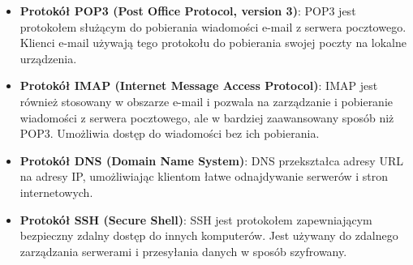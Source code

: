 \begin{itemize}
    \item \textbf{Protokół POP3 (Post Office Protocol, version 3)}: POP3 jest protokołem służącym do pobierania wiadomości e-mail z serwera pocztowego. Klienci e-mail używają tego protokołu do pobierania swojej poczty na lokalne urządzenia.

    \item \textbf{Protokół IMAP (Internet Message Access Protocol)}: IMAP jest również stosowany w obszarze e-mail i pozwala na zarządzanie i pobieranie wiadomości z serwera pocztowego, ale w bardziej zaawansowany sposób niż POP3. Umożliwia dostęp do wiadomości bez ich pobierania.

    \item \textbf{Protokół DNS (Domain Name System)}: DNS przekształca adresy URL na adresy IP, umożliwiając klientom łatwe odnajdywanie serwerów i stron internetowych.

    \item \textbf{Protokół SSH (Secure Shell)}: SSH jest protokołem zapewniającym bezpieczny zdalny dostęp do innych komputerów. Jest używany do zdalnego zarządzania serwerami i przesyłania danych w sposób szyfrowany.
\end{itemize}
